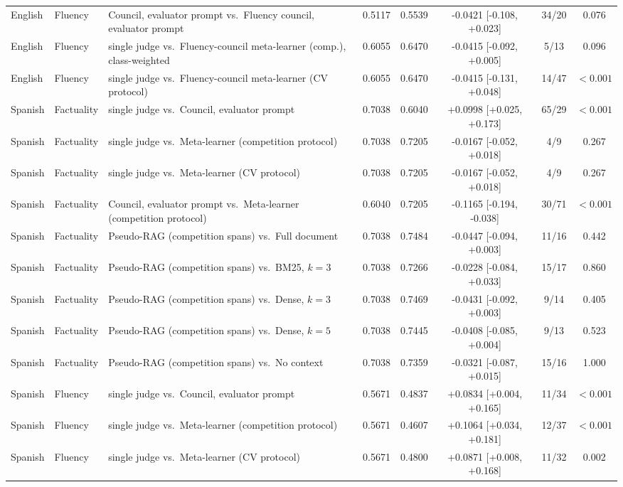 \begin{tabular}{lllccccc}
English & Fluency & Council, evaluator prompt vs.\ Fluency council, evaluator prompt & 0.5117 & 0.5539 & -0.0421 [-0.108, +0.023] & 34/20 & 0.076 \\
English & Fluency & single judge vs.\ Fluency-council meta-learner (comp.), class-weighted & 0.6055 & 0.6470 & -0.0415 [-0.092, +0.005] & 5/13 & 0.096 \\
English & Fluency & single judge vs.\ Fluency-council meta-learner (CV protocol) & 0.6055 & 0.6470 & -0.0415 [-0.131, +0.048] & 14/47 & $<0.001$ \\
\hline
Spanish & Factuality & single judge vs.\ Council, evaluator prompt & 0.7038 & 0.6040 & +0.0998 [+0.025, +0.173] & 65/29 & $<0.001$ \\
Spanish & Factuality & single judge vs.\ Meta-learner (competition protocol) & 0.7038 & 0.7205 & -0.0167 [-0.052, +0.018] & 4/9 & 0.267 \\
Spanish & Factuality & single judge vs.\ Meta-learner (CV protocol) & 0.7038 & 0.7205 & -0.0167 [-0.052, +0.018] & 4/9 & 0.267 \\
Spanish & Factuality & Council, evaluator prompt vs.\ Meta-learner (competition protocol) & 0.6040 & 0.7205 & -0.1165 [-0.194, -0.038] & 30/71 & $<0.001$ \\
Spanish & Factuality & Pseudo-RAG (competition spans) vs.\ Full document & 0.7038 & 0.7484 & -0.0447 [-0.094, +0.003] & 11/16 & 0.442 \\
Spanish & Factuality & Pseudo-RAG (competition spans) vs.\ BM25, $k=3$ & 0.7038 & 0.7266 & -0.0228 [-0.084, +0.033] & 15/17 & 0.860 \\
Spanish & Factuality & Pseudo-RAG (competition spans) vs.\ Dense, $k=3$ & 0.7038 & 0.7469 & -0.0431 [-0.092, +0.003] & 9/14 & 0.405 \\
Spanish & Factuality & Pseudo-RAG (competition spans) vs.\ Dense, $k=5$ & 0.7038 & 0.7445 & -0.0408 [-0.085, +0.004] & 9/13 & 0.523 \\
Spanish & Factuality & Pseudo-RAG (competition spans) vs.\ No context & 0.7038 & 0.7359 & -0.0321 [-0.087, +0.015] & 15/16 & 1.000 \\
\hline
Spanish & Fluency & single judge vs.\ Council, evaluator prompt & 0.5671 & 0.4837 & +0.0834 [+0.004, +0.165] & 11/34 & $<0.001$ \\
Spanish & Fluency & single judge vs.\ Meta-learner (competition protocol) & 0.5671 & 0.4607 & +0.1064 [+0.034, +0.181] & 12/37 & $<0.001$ \\
Spanish & Fluency & single judge vs.\ Meta-learner (CV protocol) & 0.5671 & 0.4800 & +0.0871 [+0.008, +0.168] & 11/32 & 0.002 \\

\end{tabular}
